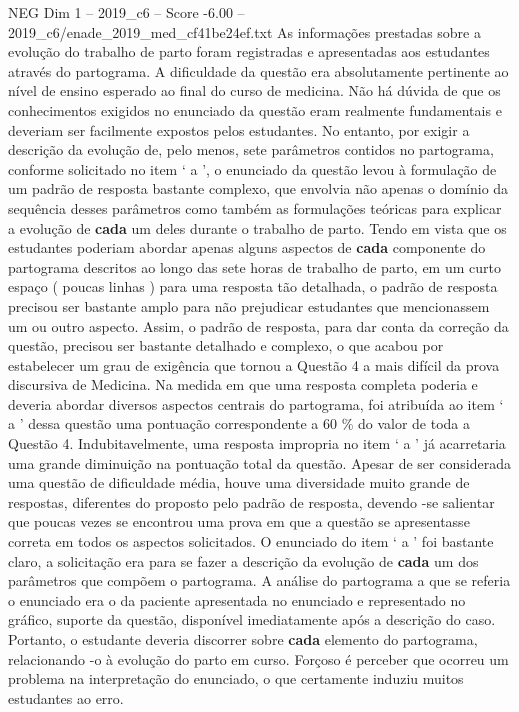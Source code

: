 \begin{textsample}{NEG Dim 1 – 2019\_c6 – Score -6.00 – 2019\_c6/enade\_2019\_med\_cf41be24ef.txt}
As informações prestadas sobre a evolução do trabalho de parto foram registradas e apresentadas aos estudantes através do partograma.
A dificuldade da questão era absolutamente pertinente ao nível de ensino esperado ao final do curso de medicina.
Não há dúvida de que os conhecimentos exigidos no enunciado da questão eram realmente fundamentais e deveriam ser facilmente expostos pelos estudantes.
No entanto, por exigir a descrição da evolução de, pelo menos, sete parâmetros contidos no partograma, conforme solicitado no item ‘ a ’, o enunciado da questão levou à formulação de um padrão de resposta bastante complexo, que envolvia não apenas o domínio da sequência desses parâmetros como também as formulações teóricas para explicar a evolução de \textbf{cada} um deles durante o trabalho de parto.
Tendo em vista que os estudantes poderiam abordar apenas alguns aspectos de \textbf{cada} componente do partograma descritos ao longo das sete horas de trabalho de parto, em um curto espaço ( poucas linhas ) para uma resposta tão detalhada, o padrão de resposta precisou ser bastante amplo para não prejudicar estudantes que mencionassem um ou outro aspecto.
Assim, o padrão de resposta, para dar conta da correção da questão, precisou ser bastante detalhado e complexo, o que acabou por estabelecer um grau de exigência que tornou a Questão 4 a mais difícil da prova discursiva de Medicina.
Na medida em que uma resposta completa poderia e deveria abordar diversos aspectos centrais do partograma, foi atribuída ao item ‘ a ’ dessa questão uma pontuação correspondente a 60 \% do valor de toda a Questão 4.
Indubitavelmente, uma resposta impropria no item ‘ a ’ já acarretaria uma grande diminuição na pontuação total da questão.
Apesar de ser considerada uma questão de dificuldade média, houve uma diversidade muito grande de respostas, diferentes do proposto pelo padrão de resposta, devendo -se salientar que poucas vezes se encontrou uma prova em que a questão se apresentasse correta em todos os aspectos solicitados.
O enunciado do item ‘ a ’ foi bastante claro, a solicitação era para se fazer a descrição da evolução de \textbf{cada} um dos parâmetros que compõem o partograma.
A análise do partograma a que se referia o enunciado era o da paciente apresentada no enunciado e representado no gráfico, suporte da questão, disponível imediatamente após a descrição do caso.
Portanto, o estudante deveria discorrer sobre \textbf{cada} elemento do partograma, relacionando -o à evolução do parto em curso.
Forçoso é perceber que ocorreu um problema na interpretação do enunciado, o que certamente induziu muitos estudantes ao erro.

\end{textsample}
